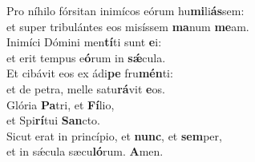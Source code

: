 \oddverse Pro níhilo fórsitan inimícos eórum hu\textbf{mi}li\textbf{ás}sem:~\*\\
\oddverse et super tribulántes eos misíssem \textbf{ma}num \textbf{me}am.\\
\evenverse Inimíci Dómini men\textbf{tí}ti sunt \textbf{e}i:~\*\\
\evenverse et erit tempus e\textbf{ó}rum in \textbf{sǽ}cula.\\
\oddverse Et cibávit eos ex ádi\textbf{pe} fru\textbf{mén}ti:~\*\\
\oddverse et de petra, melle satu\textbf{rá}vit \textbf{e}os.\\
\evenverse Glória \textbf{Pa}tri, et \textbf{Fí}lio,~\*\\
\evenverse et Spi\textbf{rí}tui \textbf{San}cto.\\
\oddverse Sicut erat in princípio, et \textbf{nunc}, et \textbf{sem}per,~\*\\
\oddverse et in sǽcula sæcu\textbf{ló}rum. \textbf{A}men.\\
